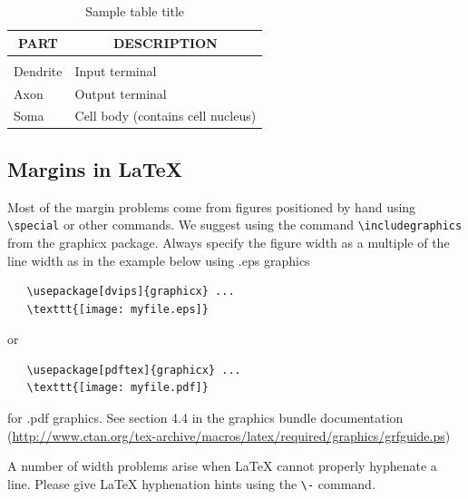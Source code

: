 \documentclass{article} %
\begin{document}
\begin{table}[t]
\caption{Sample table title}
\label{sample-table}
\begin{center}
\begin{tabular}{ll}
\multicolumn{1}{c}{\bf PART}  &\multicolumn{1}{c}{\bf DESCRIPTION}
\\ \hline \\
Dendrite         &Input terminal \\
Axon             &Output terminal \\
Soma             &Cell body (contains cell nucleus) \\
\end{tabular}
\end{center}
\end{table}



\subsection{Margins in LaTeX}

Most of the margin problems come from figures positioned by hand using
\verb+\special+ or other commands. We suggest using the command
\verb+\includegraphics+
from the graphicx package. Always specify the figure width as a multiple of
the line width as in the example below using .eps graphics
\begin{verbatim}
   \usepackage[dvips]{graphicx} ...
   \texttt{[image: myfile.eps]}
\end{verbatim}
or %
\begin{verbatim}
   \usepackage[pdftex]{graphicx} ...
   \texttt{[image: myfile.pdf]}
\end{verbatim}
for .pdf graphics.
See section 4.4 in the graphics bundle documentation (\url{http://www.ctan.org/tex-archive/macros/latex/required/graphics/grfguide.ps})

A number of width problems arise when LaTeX cannot properly hyphenate a
line. Please give LaTeX hyphenation hints using the \verb+\-+ command.




\end{document}
